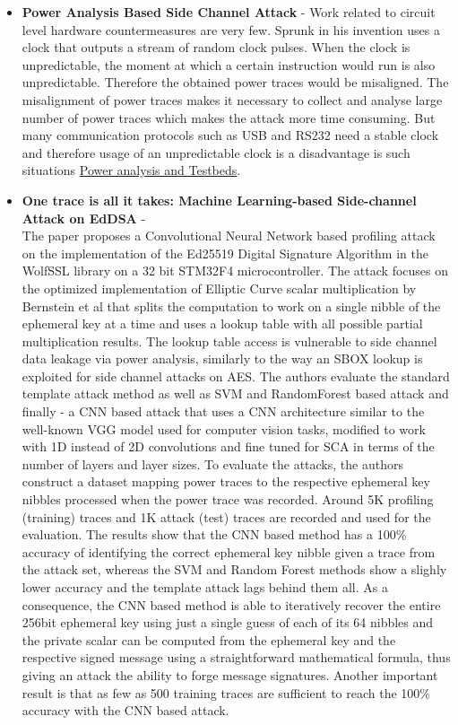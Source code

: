\begin{itemize}
    \item  \textbf{Power Analysis Based Side Channel Attack}\cite{Power_Analysis_Hasindu} -
    Work related to circuit level hardware countermeasures are very few. 
    Sprunk in his invention uses a clock that outputs a stream of random clock pulses. 
    When the clock is unpredictable, the moment at which a certain instruction would run is also unpredictable. 
    Therefore the obtained power traces would be misaligned. The misalignment of power traces makes it necessary
    to collect and analyse large number of power traces which makes the attack more time consuming. 
    But many communication protocols such as USB and RS232 need a stable clock and
    therefore usage of an unpredictable clock is a disadvantage is such situations
    \href{https://arxiv.org/pdf/1801.00932.pdf}{Power analysis and Testbeds}.

    \item   \textbf{One trace is all it takes: Machine Learning-based Side-channel Attack on EdDSA}\cite{cryptoeprint:2019:358} - \\
    The paper proposes a Convolutional Neural Network based profiling attack on the implementation of the Ed25519 Digital Signature Algorithm in the WolfSSL library on a 32 bit STM32F4 microcontroller.
    The attack focuses on the optimized implementation of Elliptic Curve scalar multiplication by Bernstein et al\cite{Bernstein2012} that splits the computation to work on a single nibble of the ephemeral key at a time and uses a lookup table with all possible partial multiplication results.
    The lookup table access is vulnerable to side channel data leakage via power analysis, similarly to the way an SBOX lookup is exploited for side channel attacks on AES.
    The authors evaluate the standard template attack method as well as SVM and RandomForest based attack and finally - a CNN based attack that uses a CNN architecture similar to the well-known VGG model used for computer vision tasks, modified to work with 1D instead of 2D convolutions and fine tuned for SCA in terms of the number of layers and layer sizes. To evaluate the attacks, the authors construct a dataset mapping power traces to the respective ephemeral key nibbles processed when the power trace was recorded. Around 5K profiling (training) traces and 1K attack (test) traces are recorded and used for the evaluation.
    The results show that the CNN based method has a 100\% accuracy of identifying the correct ephemeral key nibble given a trace from the attack set, whereas the SVM and Random Forest methods show a slighly lower accuracy and the template attack lags behind them all. As a consequence, the CNN based method is able to iteratively recover the entire 256bit ephemeral key using just a single guess of each of its 64 nibbles and the private scalar can be computed from the ephemeral key and the respective signed message using a straightforward mathematical formula, thus giving an attack the ability to forge message signatures.
    Another important result is that as few as 500 training traces are sufficient to reach the 100\% accuracy with the CNN based attack.


\end{itemize}
